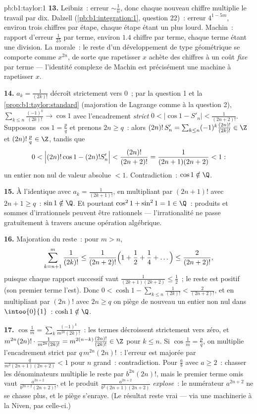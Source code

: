 \begin{solution}{pb:b1:taylor:1}
\textbf{13.} Leibniz~: erreur $\sim \frac1n$, donc chaque nouveau
chiffre multiplie le travail par dix. Dalzell
(\cref{pb:b1:integration:1}, question 22)~: erreur $4^{1-5m}$,
environ trois chiffres par étape, chaque étape étant un  plus
lourd. Machin~: rapport d'erreur $\frac{1}{25}$ par terme, environ
$1.4$ chiffre par terme, chaque terme étant une division. La morale~:
le reste d'un développement de type géométrique se comporte comme
$x^{2n}$, de sorte que rapetisser $x$ achète des chiffres à un coût
\emph{fixe} par terme --- l'identité complexe de Machin est
précisément une machine à rapetisser $x$.

\textbf{14.} $a_k = \frac{1}{(2k)!}$ décroît strictement vers $0$~;
par la question 1 et la \cref{prop:b1:taylor:standard} (majoration de
Lagrange comme à la question 2), $\sum_{k \leq n}\frac{(-1)^k}{(2k)!}
\to \cos 1$ avec l'encadrement \emph{strict} $0 < \bigl|\cos 1 -
S'_n\bigr| < \frac{1}{(2n+2)!}$. Supposons $\cos 1 = \frac pq$ et
prenons $2n \geq q$~: alors $(2n)!\,S'_n = \sum_{k\leq n} (-1)^k
\frac{(2n)!}{(2k)!} \in \Z$ et $(2n)!\,\frac pq \in \Z$, tandis que
\[
0 < \Bigl|(2n)!\cos 1 - (2n)!S'_n\Bigr| <
\frac{(2n)!}{(2n+2)!} = \frac{1}{(2n+1)(2n+2)} < 1 :
\]
un entier non nul de valeur absolue $< 1$. Contradiction~: $\cos
1 \notin \Q$.

\textbf{15.} À l'identique avec $a_k = \frac{1}{(2k+1)!}$, en
multipliant par $(2n+1)!$ avec $2n + 1 \geq q$~: $\sin 1 \notin
\Q$. Et pourtant $\cos^2 1 + \sin^2 1 = 1 \in \Q$~: produits et sommes
d'irrationnels peuvent être rationnels --- l'irrationalité ne passe
gratuitement à travers aucune opération algébrique.

\textbf{16.} Majoration du reste~: pour $m > n$,
\[
\sum_{k=n+1}^{m} \frac{1}{(2k)!}
\leq \frac{1}{(2n+2)!}\Bigl(1 + \frac12 + \frac14 +
\dots\Bigr) \leq \frac{2}{(2n+2)!} ,
\]
puisque chaque rapport successif vaut $\frac{1}{(2k+1)(2k+2)} \leq
\frac12$~; le reste est positif (son premier terme l'est). Donc $0 <
\cosh 1 - \sum_{k\leq n}\frac{1}{(2k)!} < \frac{2}{(2n+2)!}$,
et en multipliant par $(2n)!$ avec $2n \geq q$ on piège de nouveau un
entier non nul dans $\intoo{0}{1}$~: $\cosh 1 \notin \Q$.

\textbf{17.} $\cos\frac1m = \sum_k
\frac{(-1)^k}{m^{2k}(2k)!}$~: les termes décroissent strictement vers
zéro, et $m^{2n}(2n)!\cdot\frac{1}{m^{2k}(2k)!} =
m^{2(n-k)}\frac{(2n)!}{(2k)!} \in \Z$ pour $k \leq n$. Si
$\cos\frac1m = \frac pq$, on multiplie l'encadrement strict par
$q\,m^{2n}(2n)!$~: l'erreur est majorée par
$\frac{q}{m^2(2n+1)(2n+2)} < 1$ pour $n$ grand~: contradiction.
Pour $\frac ab$ avec $a \geq 2$~: chasser les dénominateurs multiplie
le reste par $b^{2n}(2n)!$, mais le premier terme omis vaut
$\frac{a^{2n+2}}{b^{2n+2}(2n+2)!}$, et le produit
$\frac{a^{2n+2}}{b^2(2n+1)(2n+2)}$ \emph{explose}~: le
numérateur $a^{2n+2}$ ne se chasse plus, et le piège s'enraye.
(Le résultat reste vrai --- via une machinerie à la Niven, pas
celle-ci.)


\end{solution}
